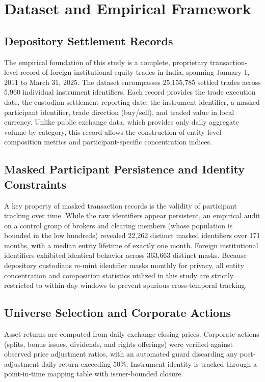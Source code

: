 \documentclass{ieeeaccess}
\begin{document}
\section{Dataset and Empirical Framework}
\label{sec:data}

\subsection{Depository Settlement Records}
The empirical foundation of this study is a complete, proprietary transaction-level record of foreign institutional equity trades in India, spanning January 1, 2011 to March 31, 2025. The dataset encompasses 25,155,785 settled trades across 5,960 individual instrument identifiers. Each record provides the trade execution date, the custodian settlement reporting date, the instrument identifier, a masked participant identifier, trade direction (buy/sell), and traded value in local currency. Unlike public exchange data, which provides only daily aggregate volume by category, this record allows the construction of entity-level composition metrics and participant-specific concentration indices.

\subsection{Masked Participant Persistence and Identity Constraints}
A key property of masked transaction records is the validity of participant tracking over time. While the raw identifiers appear persistent, an empirical audit on a control group of brokers and clearing members (whose population is bounded in the low hundreds) revealed 22,262 distinct masked identifiers over 171 months, with a median entity lifetime of exactly one month. Foreign institutional identifiers exhibited identical behavior across 363,663 distinct masks. Because depository custodians re-mint identifier masks monthly for privacy, all entity concentration and composition statistics utilized in this study are strictly restricted to within-day windows to prevent spurious cross-temporal tracking.

\subsection{Universe Selection and Corporate Actions}
Asset returns are computed from daily exchange closing prices. Corporate actions (splits, bonus issues, dividends, and rights offerings) were verified against observed price adjustment ratios, with an automated guard discarding any post-adjustment daily return exceeding 50\%. Instrument identity is tracked through a point-in-time mapping table with issuer-bounded closure.
\end{document}
